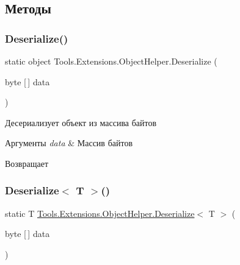 \subsection{Методы}
\mbox{\label{class_tools_1_1_extensions_1_1_object_helper_a1f1a9f90cbeb2e866dd5cf84c454240d}} 
\subsubsection{\texorpdfstring{Deserialize()}{Deserialize()}}
{\footnotesize\ttfamily static object Tools.\+Extensions.\+Object\+Helper.\+Deserialize (\begin{DoxyParamCaption}\item[{byte \mbox{[}$\,$\mbox{]}}]{data }\end{DoxyParamCaption})\hspace{0.3cm}{\ttfamily [static]}}



Десериализует объект из массива байтов 


\begin{DoxyParams}{Аргументы}
{\em data} & Массив байтов\\
\hline
\end{DoxyParams}
\begin{DoxyReturn}{Возвращает}

\end{DoxyReturn}
\mbox{\label{class_tools_1_1_extensions_1_1_object_helper_a02cf5ec56eebde420b8baa225a04e83d}} 
\subsubsection{\texorpdfstring{Deserialize$<$ T $>$()}{Deserialize< T >()}}
{\footnotesize\ttfamily static T \hyperlink{class_tools_1_1_extensions_1_1_object_helper_a1f1a9f90cbeb2e866dd5cf84c454240d}{Tools.\+Extensions.\+Object\+Helper.\+Deserialize}$<$ T $>$ (\begin{DoxyParamCaption}\item[{byte \mbox{[}$\,$\mbox{]}}]{data }\end{DoxyParamCaption})\hspace{0.3cm}{\ttfamily [static]}}



